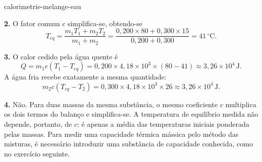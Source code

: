 \begin{exo}{calorimetrie-melange-eau}
\begin{solution}
\textbf{2.} O fator comum $c$ simplifica-se, obtendo-se
\[
T_{eq}=\frac{m_1T_1+m_2T_2}{m_1+m_2}
=\frac{0{,}200\times80+0{,}300\times15}{0{,}200+0{,}300}
=41\,^\circ\text{C}.
\]

\textbf{3.} O calor cedido pela água quente é
\[
Q=m_1c(T_1-T_{eq})
=0{,}200\times4{,}18\times10^3\times(80-41)
\approx3{,}26\times10^4\,\text{J}.
\]
A água fria recebe exatamente a mesma quantidade:
\[
m_2c(T_{eq}-T_2)
=0{,}300\times4{,}18\times10^3\times26
\approx3{,}26\times10^4\,\text{J}.
\]

\textbf{4.} Não. Para duas massas da mesma substância, o mesmo coeficiente $c$ multiplica os dois termos do balanço e simplifica-se. A temperatura de equilíbrio medida não depende, portanto, de $c$: é apenas a média das temperaturas iniciais ponderada pelas massas. Para medir uma capacidade térmica mássica pelo método das misturas, é necessário introduzir uma substância de capacidade conhecida, como no exercício seguinte.
\end{solution}
\end{exo}

